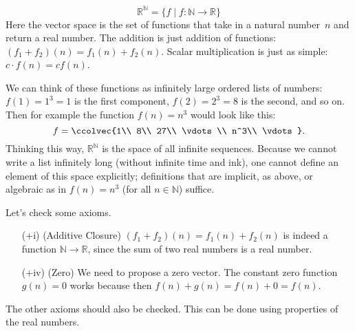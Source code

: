 \begin{example}
\[ \mathbb{R}^{\mathbb{N}} = \{f \mid f \colon \mathbb{N} \rightarrow \mathbb{R} \} \]
Here the vector space is the set of functions that take in a natural number~$n$ and return a real number.  The addition is just addition of functions: $(f_1 + f_2)(n) = f_1(n) + f_2(n)$.  Scalar multiplication is just as simple: $c \cdot f(n) = cf(n)$.



We can think of these functions as infinitely large ordered lists of numbers: \(f(1)=1^3=1\) is the first component, \(f(2)=2^3=8\) is the second, and so on. Then for example the function \(f(n)=n^3\) would look like this:
\[
f=\ccolvec{1\\ 8\\ 27\\ \vdots\\ n^3\\ \vdots }.
\]
Thinking this way, \(\mathbb{R}^{\mathbb{N}}\) is the space of all infinite sequences. 
Because we cannot write a list infinitely long (without infinite time and ink), one cannot define an element of this space explicitly; definitions that are implicit, as above, or algebraic as in $f(n)=n^3$ (for all $n \in \mathbb{N}$) suffice.

Let's check some axioms.

\begin{itemize}
\item[(+i)] (Additive Closure) $(f_1 + f_2)(n)=f_1(n) +f_2(n)$ is indeed a function 
$\mathbb{N} \rightarrow \mathbb{R}$, since the sum of two real numbers is a real number.

\item[(+iv)] (Zero) We need to propose a zero vector.  The constant zero function $g(n) = 0$ works because then $f(n) + g(n) = f(n) + 0 = f(n)$.
\end{itemize}
The other axioms should also be checked.  This can be done using  properties of the real numbers.
\end{example}

